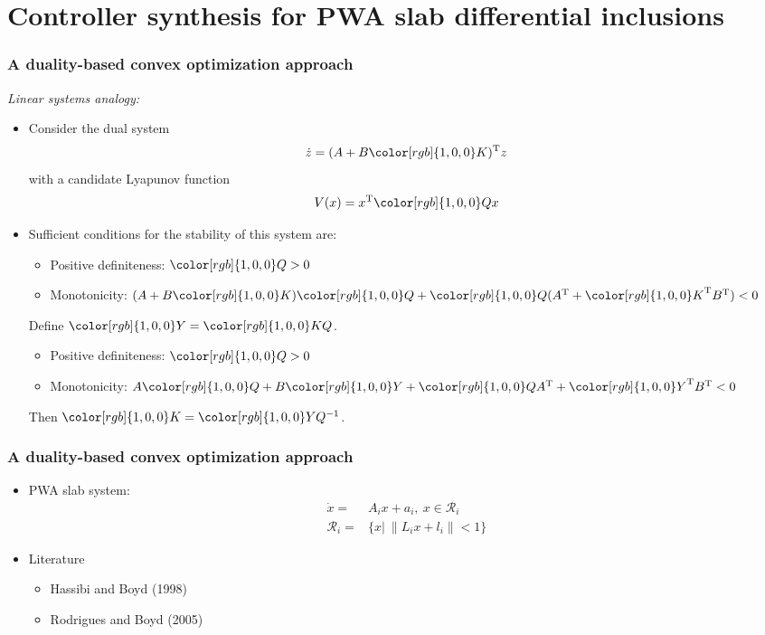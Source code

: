 \documentclass{beamer}
\newcommand{\red}{\color[rgb]{1,0,0}}
\newcommand{\TR}{\text{T}}
\newcommand{\beq}{\begin{equation*}}
\newcommand{\eeq}{\end{equation*}}
\begin{document}


  \section[]{Controller synthesis for PWA slab differential inclusions}
  \frame
  {
    \frametitle{A duality-based convex optimization approach}
\emph{Linear systems analogy:}
\begin{itemize}
    \item Consider the dual system 
    \beq
    \dot z=(A+B{\red K})^\TR z
    \eeq 
    with a candidate Lyapunov function 
    \beq
    V(x)=x^\TR {\red Q}x
    \eeq 
    \item Sufficient conditions for the stability of this system are: 
    \begin{itemize}
    \item Positive definiteness: ${\red Q}>0$
    \item Monotonicity: $(A+B{\red K}) {\red Q}+{\red Q}(A^\TR+{\red K}^\TR B^\TR)<0$
    \end{itemize}
    Define ${\red Y}={\red KQ}$.
    \begin{itemize}
    \item Positive definiteness: ${\red Q}>0$
    \item Monotonicity: $A{\red Q}+B{\red Y} +{\red Q}A^\TR+{\red Y}^\TR B^\TR<0$
    \end{itemize}
    Then ${\red K}={\red YQ^{-1}}$.
    \end{itemize}
  }
  
    \frame
  {
    \frametitle{A duality-based convex optimization approach}
    \begin{itemize}
    \item PWA slab system:
\begin{align}
\dot x =&A_{i}x+a_{i},\ x\in{\mathcal R}_i\nonumber\\
{\mathcal R}_i=& \{x|\ \|L_ix+l_i\|<1 \}\nonumber
\end{align}
\item Literature
\begin{itemize}
\item Hassibi and Boyd (1998)
\item Rodrigues and Boyd (2005)
\end{itemize}
\end{itemize}
  }
\end{document}
